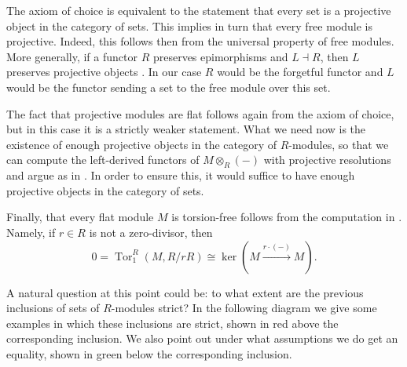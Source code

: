 \documentclass[A4paper, 12pt, british, reqno]{amsart}
\theoremstyle{plain}
\theoremstyle{definition}
\theoremstyle{remark}
\theoremstyle{plain}
\theoremstyle{definition}
\theoremstyle{remark}
\theoremstyle{plain}
\theoremstyle{definition}
\theoremstyle{remark}
\newcommand\tikzmark[1]{%
\tikz[remember picture,overlay] \node[inner xsep=0pt] (#1) {};
}
\DeclareMathOperator{\Tor}{Tor}
\newcommand{\ot}{\otimes}
\begin{document}
\begin{center}
\end{center}

{\color{gray}
The axiom of choice is equivalent to the statement that every set is a projective object in the category of sets.
This implies in turn that every free module is projective.
Indeed, this follows then from the universal property of free modules.
More generally, if a functor $R$ preserves epimorphisms and $L\dashv R$, then $L$ preserves projective objects \cite[Dual of Fact 1.1.1]{fra18}.
In our case $R$ would be the forgetful functor and $L$ would be the functor sending a set to the free module over this set.

The fact that projective modules are flat follows again from the axiom of choice, but in this case it is a strictly weaker statement.
What we need now is the existence of enough projective objects in the category of $R$-modules, so that we can compute the left-derived functors of $M\ot_{R}(-)$ with projective resolutions and argue as in \cite[Fact 1.2.1]{fra18}.
In order to ensure this, it would suffice to have enough projective objects in the category of sets.

Finally, that every flat module $M$ is torsion-free follows from the computation in \cite[Example 1.2.1]{fra18}.
Namely, if $r\in R$ is not a zero-divisor, then
\[ 0=\Tor^{R}_{1}(M,R/rR)\cong \ker(M\xrightarrow{r\cdot (-)}M). \]
}

A natural question at this point could be: to what extent are the previous inclusions of sets of $R$-modules strict?
In the following diagram we give some examples in which these inclusions are strict, shown in red above the corresponding inclusion.
We also point out under what assumptions we do get an equality, shown in green below the corresponding inclusion.
\end{document}
